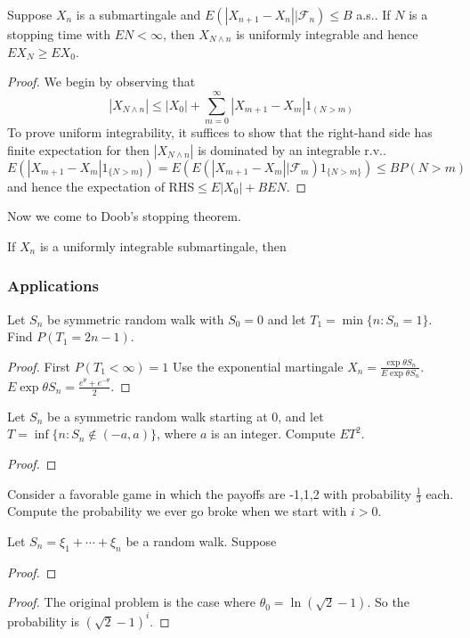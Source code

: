 \begin{theorem}
    Suppose $X_n$ is a submartingale and $E(|X_{n+1}-X_n||\mathcal{F}_n)\le B$ a.s..
    If $N$ is a stopping time with $EN<\infty$, then $X_{N\wedge n}$ is uniformly integrable
    and hence $EX_N\geq EX_0$.
\end{theorem}
\begin{proof}
    We begin by observing that \[|X_{N\wedge n}|\le |X_0|+\sum_{m=0}^\infty|X_{m+1}-X_m|1_{(N>m)}\] 
    To prove uniform integrability, it suffices to show that the right-hand side has finite expectation for then $|X_{N\wedge n}|$ is dominated by an integrable r.v..\newline 
    \[ E(|X_{m+1}-X_m|1_{\{N>m\}})=E(E(|X_{m+1}-X_m||\mathcal{F}_m)1_{\{N>m\}})\le BP(N>m)\] 
    and hence the expectation of RHS$\le E|X_0|+BEN$.
\end{proof}

Now we come to Doob's stopping theorem.
\begin{theorem}
    If $X_n$ is a uniformly integrable submartingale, then 
\end{theorem}


\subsubsection{Applications}
\begin{example}
    
\end{example}

\begin{example}
    Let $S_n$ be symmetric random walk with $S_0=0$ and let $T_1=\min\{n:S_n=1\}$.
    Find $P(T_1=2n-1)$.
\end{example}
\begin{proof}
    First $P(T_1<\infty)=1$
    Use the exponential martingale $X_n=\frac{\exp{\theta S_n}}{E\exp{\theta S_n}}$. $E\exp{\theta S_n}=\frac{e^\theta+e^{-\theta}}{2}$.
\end{proof}

\begin{example}
    Let $S_n$ be a symmetric random walk starting at $0$, and let $T=\inf\{n:S_n\notin (-a,a)\}$,
    where $a$ is an integer. Compute $ET^2$.
\end{example}
\begin{proof}
    
\end{proof}

\begin{example}
    Consider a favorable game in which the payoffs are -1,1,2 with probability $\frac{1}{3}$ each. Compute the probability 
    we ever go broke when we start with $i>0$.
\end{example}
\begin{lemma}
    Let $S_n=\xi_1+\cdots+\xi_n$ be a random walk. Suppose  
\end{lemma}
\begin{proof}
    
\end{proof}
\begin{proof}
    The original problem is the case where $\theta_0=\ln (\sqrt{2}-1)$. So the probability is $(\sqrt{2}-1)^i$.
\end{proof}
